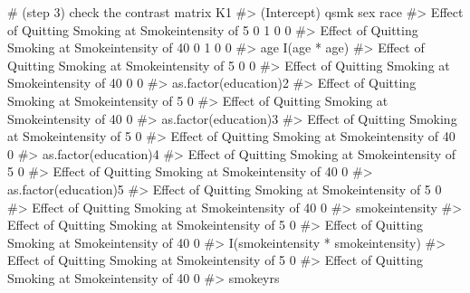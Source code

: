 \documentclass[
  10pt,
  a4paper,
]{book}
\newenvironment{Shaded}{\begin{snugshade}}{\end{snugshade}}
\newcommand{\CommentTok}[1]{\textcolor[rgb]{0.37,0.37,0.37}{#1}}
\newcommand{\NormalTok}[1]{\textcolor[rgb]{0.00,0.46,0.62}{#1}}
\begin{document}
\begin{Shaded}
\begin{Highlighting}[]
\CommentTok{\# (step 3) check the contrast matrix}
\NormalTok{K1}
\CommentTok{\#\textgreater{}                                                    (Intercept) qsmk sex race}
\CommentTok{\#\textgreater{} Effect of Quitting Smoking at Smokeintensity of 5            0    1   0    0}
\CommentTok{\#\textgreater{} Effect of Quitting Smoking at Smokeintensity of 40           0    1   0    0}
\CommentTok{\#\textgreater{}                                                    age I(age * age)}
\CommentTok{\#\textgreater{} Effect of Quitting Smoking at Smokeintensity of 5    0            0}
\CommentTok{\#\textgreater{} Effect of Quitting Smoking at Smokeintensity of 40   0            0}
\CommentTok{\#\textgreater{}                                                    as.factor(education)2}
\CommentTok{\#\textgreater{} Effect of Quitting Smoking at Smokeintensity of 5                      0}
\CommentTok{\#\textgreater{} Effect of Quitting Smoking at Smokeintensity of 40                     0}
\CommentTok{\#\textgreater{}                                                    as.factor(education)3}
\CommentTok{\#\textgreater{} Effect of Quitting Smoking at Smokeintensity of 5                      0}
\CommentTok{\#\textgreater{} Effect of Quitting Smoking at Smokeintensity of 40                     0}
\CommentTok{\#\textgreater{}                                                    as.factor(education)4}
\CommentTok{\#\textgreater{} Effect of Quitting Smoking at Smokeintensity of 5                      0}
\CommentTok{\#\textgreater{} Effect of Quitting Smoking at Smokeintensity of 40                     0}
\CommentTok{\#\textgreater{}                                                    as.factor(education)5}
\CommentTok{\#\textgreater{} Effect of Quitting Smoking at Smokeintensity of 5                      0}
\CommentTok{\#\textgreater{} Effect of Quitting Smoking at Smokeintensity of 40                     0}
\CommentTok{\#\textgreater{}                                                    smokeintensity}
\CommentTok{\#\textgreater{} Effect of Quitting Smoking at Smokeintensity of 5               0}
\CommentTok{\#\textgreater{} Effect of Quitting Smoking at Smokeintensity of 40              0}
\CommentTok{\#\textgreater{}                                                    I(smokeintensity * smokeintensity)}
\CommentTok{\#\textgreater{} Effect of Quitting Smoking at Smokeintensity of 5                                   0}
\CommentTok{\#\textgreater{} Effect of Quitting Smoking at Smokeintensity of 40                                  0}
\CommentTok{\#\textgreater{}                                                    smokeyrs}

\end{Highlighting}
\end{Shaded}
\end{document}
